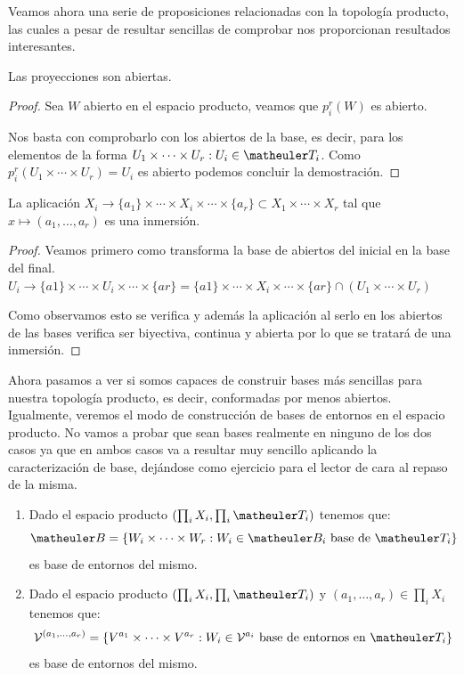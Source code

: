 Veamos ahora una serie de proposiciones relacionadas con la topología producto, las cuales a pesar de resultar sencillas de comprobar nos proporcionan resultados interesantes.

\begin{prop}
	Las proyecciones son abiertas.
	
	\begin{proof}
		Sea $W$ abierto en el espacio producto, veamos que $p_i^r(W)$ es abierto.
		
		Nos basta con comprobarlo con los abiertos de la base, es decir, para los elementos de la forma $ U_1\times\cdots\times U_r : U_i\in \T_i$.  Como  $p_i^r(U_1\times\cdots\times U_r)=U_i$ es abierto podemos concluir la demostración.
	\end{proof}
\end{prop}


\begin{prop}
	La aplicación $X_i\to\{a_1\}\times\cdots\times X_i\times\cdots\times \{a_r\}\subset X_1\times\cdots\times X_r$ tal que $x\mapsto (a_1,\dots,a_r)$ es una inmersión.
	
	\begin{proof}
		Veamos primero como transforma la base de abiertos del inicial en la base del final.
		$U_i\longrightarrow\{a1\}\times\cdots\times U_i\times\cdots\times \{ar\}=\{a1\}\times\cdots\times X_i\times\cdots\times \{ar\}\cap(U_1\times\cdots\times U_r)$
		
		Como observamos esto se verifica y además la aplicación al serlo en los abiertos de las bases verifica ser biyectiva, continua y abierta por lo que se tratará de una inmersión.
	\end{proof}
\end{prop}

Ahora pasamos a ver si somos capaces de construir bases más sencillas para nuestra topología producto, es decir, conformadas por menos abiertos. Igualmente, veremos el modo de construcción de bases de entornos en el espacio producto. No vamos a probar que sean bases realmente en ninguno de los dos casos ya que en ambos casos va a resultar muy sencillo aplicando la caracterización de base, dejándose como ejercicio para el lector de cara al repaso de la misma.
\begin{enumerate}
	\item Dado el espacio producto $(\prod_iX_i,\prod_i\T_i)$ tenemos que: \[\B=\{W_i\times\cdots\times W_r:W_i\in \B_i \text{ base de }\T_i\}\] es base de entornos del mismo.
	\item Dado el espacio producto $(\prod_iX_i,\prod_i\T_i)$ y $(a_1,\dots,a_r)\in\prod_iX_i$ tenemos que: \[\V^{(a_1,\dots,a_r)}=\{V^{a_1}\times\cdots\times V^{a_r}:W_i\in \V^{a_i} \text{ base de entornos en } \T_i\} \] es base de entornos del mismo.
\end{enumerate}

